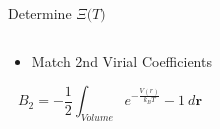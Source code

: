 \documentclass{beamer}
\renewcommand{\vec}[1]{\mathbf{#1}}
\begin{document}
\begin{frame}{Determine $\Xi{(}T)$}
	\begin{columns}[t]
	    \vspace{-0.5em}
		\begin{block}{}
            \begin{itemize}
			    \item Match 2nd Virial Coefficients
			\end{itemize}
		    
		    \begin{displaymath}B_2=-\frac{1}{2}\int_{Volume} e^{-\frac{V(r)}{k_{B}T}}-1~d\vec r\end{displaymath} 					    
		     

\end{block}
\end{columns}
\end{frame}
\end{document}
